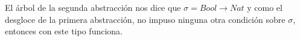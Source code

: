 \begin{landscape}
\begin{center}
\begin{scprooftree}

    \end{scprooftree}
\end{center}

\vspace*{5mm}
El árbol de la segunda abstracción nos dice que $\sigma = Bool\to Nat$ y como el desgloce de la primera abstracción, no impuso ninguna otra condición sobre $\sigma$, entonces con este tipo funciona.

\end{landscape}
